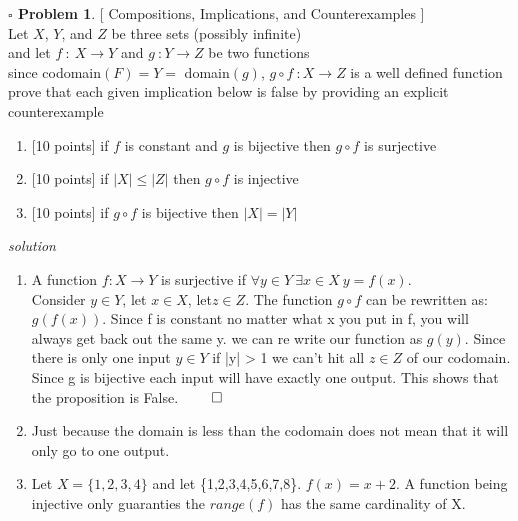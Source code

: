 \documentclass[11pt,twoside]{amsart}
\theoremstyle{definition}
\newtheorem{bprob}{$\square$ Problem}
\begin{document}
\begin{bprob}
  {[ Compositions, Implications, and Counterexamples ]} \\ 
Let $X$, $Y$, and $Z$ be three sets (possibly infinite) \\ 
and let $f \ : \ X \rightarrow Y$ and $g \ : Y \rightarrow Z$ be two functions \\
since codomain$(F) = Y =$ domain$(g)$, $g \circ f \ : X \rightarrow Z$ is a well defined function \\
prove that each given implication below is false by providing an explicit counterexample 
\begin{enumerate}[label= 2.\arabic*, itemsep=0.2cm]
  \item {[10 points]} if $f$ is constant and $g$ is bijective then $g \circ f$ is surjective
  \item {[10 points]} if $|X| \leq |Z|$ then $g \circ f$ is injective
  \item {[10 points]} if $g \circ f$ is bijective then $|X| =|Y|$


\end{enumerate}

\end{bprob}
\emph{solution}

\begin{enumerate}[label= 2.\arabic*), itemsep=0.4cm]
  \item %

 A function  $f:X \to Y$ is surjective if $\forall y \in Y \ \exists x \in X \ y = f(x)$. \medskip \\
Consider $y \in Y$, let $x \in X$, let$z \in Z$. 
The function $g \circ f$ can be rewritten as: $g(f(x))$. 
Since f is constant no matter what x you put in f, you will always get back out the same y. we can re write our function as $g(y)$. Since there is only one input $y \in Y$ if |y| > 1 we can't hit all $z \in Z$ of our codomain. Since g is bijective each input will have exactly one output. This shows that the proposition is False. $\qed$


  \item %
    Just because the domain is less than the codomain does not mean that it will only go to one output. 

    

  \item %
    Let $ X = \{1,2,3,4\}$ and let \{1,2,3,4,5,6,7,8\}.
   $f(x) = x+2$. A function being injective only guaranties the $range(f)$ has the same cardinality of X. 
    

\end{enumerate}
\end{document}
